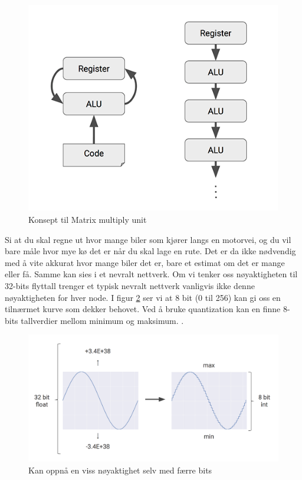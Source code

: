 \begin{figure}[hb]
    \centering
    \includegraphics[width=\textwidth]{images/MXU.png}
    \caption{Konsept til Matrix multiply unit}
    \label{fig:mxu}
\end{figure}

Si at du skal regne ut hvor mange biler som kjører langs en motorvei, og du vil bare måle hvor mye kø det er når du skal lage en rute. Det er da ikke nødvendig med å vite akkurat hvor mange biler det er, bare et estimat om det er mange eller få. Samme kan sies i et nevralt nettverk. Om vi tenker oss nøyaktigheten til 32-bits flyttall trenger et typisk nevralt nettverk vanligvis ikke denne nøyaktigheten for hver node. I figur \ref{fig:quant} ser vi at 8 bit (0 til 256) kan gi oss en tilnærmet kurve som dekker behovet. Ved å bruke quantization kan en finne 8-bits tallverdier mellom minimum og maksimum. \cite{look_at_TPU}.
 
\begin{figure}[t]
    \centering
    \includegraphics[width=\textwidth]{images/quantization.png}
    \caption{Kan oppnå en viss nøyaktighet selv med færre bits}
    \label{fig:quant}
\end{figure}

